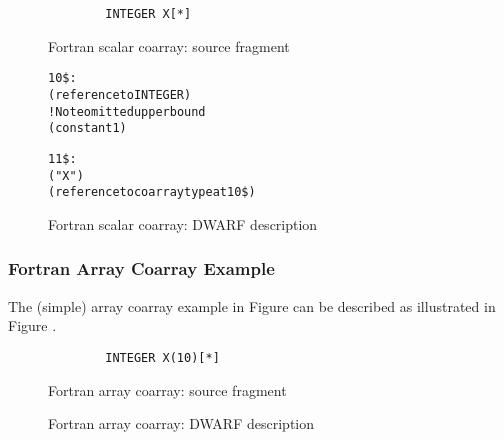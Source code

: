 \begin{figure}[!h]
\begin{lstlisting}
        INTEGER X[*]
\end{lstlisting}
\caption{Fortran scalar coarray: source fragment}
\label{fig:Fortranscalarcoarraysourcefragment}
\end{figure}

\begin{figure}[!h]
\begin{dwflisting}
\begin{alltt}
10\$:  \DWTAGcoarraytype
        \DWATtype(reference to INTEGER)
        \DWTAGsubrangetype                ! Note omitted upper bound			
            \DWATlowerbound(constant 1)

11\$:  \DWTAGvariable
        \DWATname("X")
        \DWATtype(reference to coarray type at 10\$)
\end{alltt}
\end{dwflisting}
\caption{Fortran scalar coarray: DWARF description}
\label{fig:FortranscalarcoarrayDWARFdescription}
\end{figure}

\subsubsection{Fortran Array Coarray Example}
The  (simple) array coarray example
in Figure  can be described as 
illustrated in Figure .

\begin{figure}[h]
\begin{lstlisting}
        INTEGER X(10)[*]
\end{lstlisting}
\caption{Fortran array coarray: source fragment}
\label{fig:Fortranarraycoarraysourcefragment}
\end{figure}

\begin{figure}[h]
\caption{Fortran array coarray: DWARF description}
\label{fig:FortranarraycoarrayDWARFdescription}
\end{figure}

